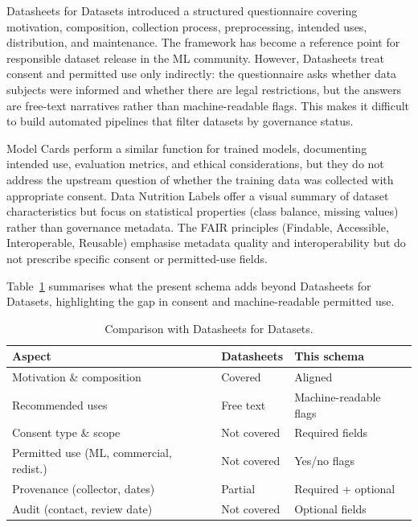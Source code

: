 \documentclass{article}
\begin{document}
Datasheets for Datasets \cite{gebru2021} introduced a structured questionnaire covering motivation, composition, collection process, preprocessing, intended uses, distribution, and maintenance. The framework has become a reference point for responsible dataset release in the ML community. However, Datasheets treat consent and permitted use only indirectly: the questionnaire asks whether data subjects were informed and whether there are legal restrictions, but the answers are free-text narratives rather than machine-readable flags. This makes it difficult to build automated pipelines that filter datasets by governance status.

Model Cards \cite{gebru2021} perform a similar function for trained models, documenting intended use, evaluation metrics, and ethical considerations, but they do not address the upstream question of whether the training data was collected with appropriate consent. Data Nutrition Labels offer a visual summary of dataset characteristics but focus on statistical properties (class balance, missing values) rather than governance metadata. The FAIR principles (Findable, Accessible, Interoperable, Reusable) emphasise metadata quality and interoperability but do not prescribe specific consent or permitted-use fields.

Table~\ref{tab:comparison} summarises what the present schema adds beyond Datasheets for Datasets, highlighting the gap in consent and machine-readable permitted use.

\begin{table}[t]
\centering
\caption{Comparison with Datasheets for Datasets.}
\label{tab:comparison}
\small
\begin{tabular}{@{}p{2.5cm}ll@{}}
\toprule
Aspect & Datasheets & This schema \\
\midrule
Motivation \& composition & Covered & Aligned \\
Recommended uses & Free text & Machine-readable flags \\
Consent type \& scope & Not covered & Required fields \\
Permitted use (ML, commercial, redist.) & Not covered & Yes/no flags \\
Provenance (collector, dates) & Partial & Required + optional \\
Audit (contact, review date) & Not covered & Optional fields \\
\bottomrule
\end{tabular}
\end{table}
\end{document}
